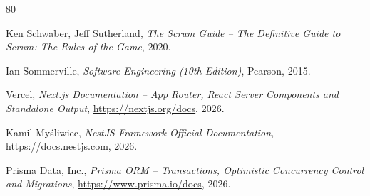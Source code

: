 \documentclass[a4paper,12pt]{article}
\begin{document}
\newpage
\begin{thebibliography}{80}

Ken Schwaber, Jeff Sutherland,
\textit{The Scrum Guide -- The Definitive Guide to Scrum: The Rules of the Game},
2020.

Ian Sommerville,
\textit{Software Engineering (10th Edition)},
Pearson, 2015.

Vercel,
\textit{Next.js Documentation -- App Router, React Server Components and Standalone Output},
\url{https://nextjs.org/docs}, 2026.

Kamil Myśliwiec,
\textit{NestJS Framework Official Documentation},
\url{https://docs.nestjs.com}, 2026.

Prisma Data, Inc.,
\textit{Prisma ORM -- Transactions, Optimistic Concurrency Control and Migrations},
\url{https://www.prisma.io/docs}, 2026.

\end{thebibliography}
\end{document}
